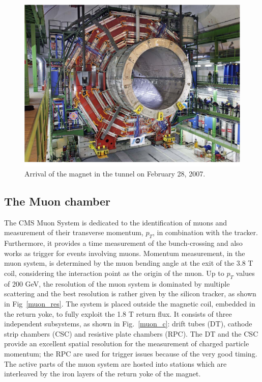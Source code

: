 \begin{figure}
\centering
\includegraphics[scale= 0.35]{../Cap2/magnet}
\caption{Arrival of the magnet in the tunnel on February 28, 2007.}
\label{magnetarrival}
\end{figure}

\subsection*{The Muon chamber}
The CMS Muon System  is dedicated to the identification of muons and
measurement of their transverse momentum, $p_T$, in combination with the tracker. Furthermore, it provides a time measurement
of the bunch-crossing and also works as trigger for events involving muons. Momentum
measurement, in the muon system, is determined by the muon bending angle at the exit
of the 3.8 T coil, considering the interaction point as the origin of the muon. Up to $p_T$
values of 200 GeV, the resolution of the muon system is dominated by multiple scattering
and the best resolution is rather given by the silicon tracker, as
shown in Fig~\ref{muon_res}. The system is placed outside
the magnetic coil, embedded in the return yoke, to fully exploit the 1.8 T return flux. It
consists of three independent subsystems, as shown in Fig.~\ref{muon_c}: drift tubes (DT), cathode strip chambers (CSC) and resistive plate
chambers (RPC). The DT and the CSC provide an excellent spatial resolution for the
measurement of charged particle momentum; the RPC are used for trigger issues because
of the very good timing. The active parts of the muon system are hosted into stations
which are interleaved by the iron layers of the return yoke of the magnet. 

